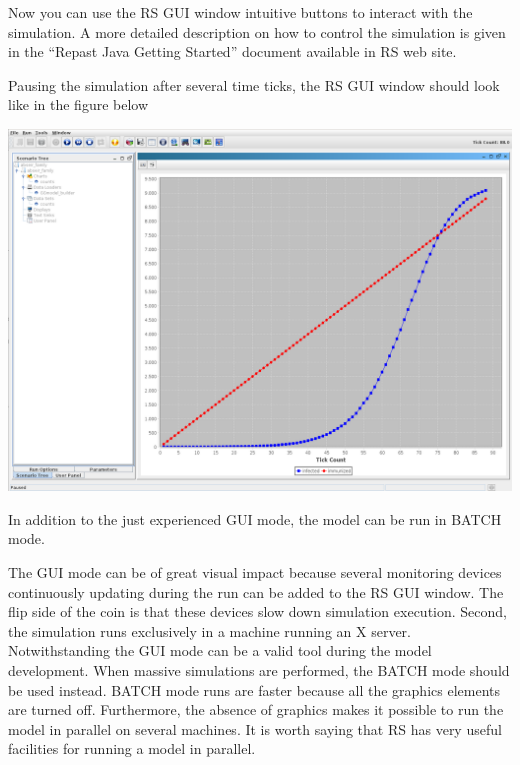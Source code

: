 \documentclass{article}
\begin{document}
Now you can use the RS GUI window intuitive buttons to interact with the simulation. A more detailed description on how to control the simulation is given in the ``Repast Java Getting Started'' document available in RS web site.

Pausing the simulation after several time ticks, the RS GUI window should look like in the figure below 

\noindent
\includegraphics[scale=0.2]{fig_abseir_family_rs_gui1}



In addition to the just experienced GUI mode, the model can be run in BATCH mode. 

The GUI mode can be of great visual impact because several monitoring devices continuously updating during the run can be added to the RS GUI window. The flip side of the coin is that these devices slow down simulation execution. Second, the simulation runs exclusively in a machine running an X server. Notwithstanding the GUI mode can be a valid tool during the model development. When massive simulations are performed, the BATCH mode should be used instead. BATCH mode runs are faster because all the graphics elements are turned off. Furthermore, the absence of graphics makes it possible to run the model in parallel on several machines. It is worth saying that RS has very useful facilities for running a model in parallel.
\end{document}
